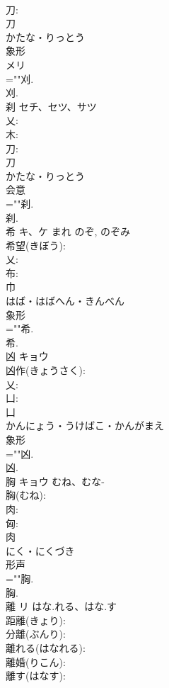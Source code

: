 \documentclass[8pt]{extreport}
\begin{document}
\begin{CJK}{UTF8}{min}
\\	刀: 
\\	刀	
\\	かたな・りっとう	
\\	象形 
\\	メリ
\\	=""刈.
\\	刈.
\\	刹	セチ、セツ、サツ			
\\	乂: 
\\	木: 
\\	刀: 
\\	刀	
\\	かたな・りっとう	
\\	会意 
\\	=""刹.
\\	刹.
\\	希	キ、ケ	まれ	のぞ, のぞみ	
\\	希望(きぼう): 
\\	乂: 
\\	布: 
\\	巾	
\\	はば・はばへん・きんべん	
\\	象形 
\\	=""希.
\\	希.
\\	凶	キョウ			
\\	凶作(きょうさく): 
\\	乂: 
\\	凵: 
\\	凵	
\\	かんにょう・うけばこ・かんがまえ	
\\	象形 
\\	=""凶.
\\	凶.
\\	胸	キョウ	むね、むな-		
\\	胸(むね): 
\\	肉: 
\\	匈: 
\\	肉	
\\	にく・にくづき	
\\	形声 
\\	=""胸.
\\	胸.
\\	離	リ	はな.れる、はな.す		
\\	距離(きょり): 
\\	分離(ぶんり): 
\\	離れる(はなれる): 
\\	離婚(りこん): 
\\	離す(はなす): 

\end{CJK}
\end{document}
